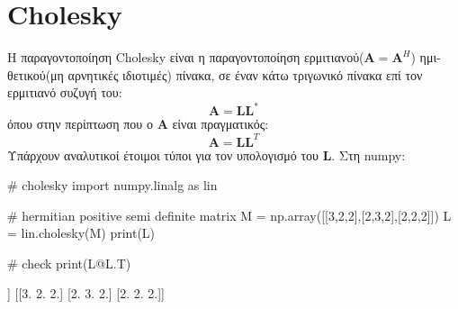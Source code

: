 \section{{\en Cholesky}}
Η παραγοντοποίηση {\en Cholesky} είναι η παραγοντοποίηση  ερμιτιανού($\mathbf{A}=\mathbf{A}^{H}$) ημι-θετικού(μη αρνητικές ιδιοτιμές) πίνακα, σε έναν κάτω τριγωνικό πίνακα επί τον ερμιτιανό συζυγή του:
\begin{equation}
\mathbf{A}=\mathbf{L} \mathbf{L}^{*}
\end{equation}
όπου στην περίπτωση που ο $\mathbf{A}$ είναι πραγματικός:
\begin{equation}
\mathbf{A}=\mathbf{L} \mathbf{L}^T
\end{equation}
Υπάρχουν αναλυτικοί έτοιμοι τύποι για τον υπολογισμό του $
\mathbf{L}$. Στη {\en numpy}:
\en
\begin{python}
# cholesky
import numpy.linalg as lin

# hermitian positive semi definite matrix
M = np.array([[3,2,2],[2,3,2],[2,2,2]])
L = lin.cholesky(M)
print(L)

# check
print(L@L.T)
\end{python}
\vspace*{-0.7cm}
\begin{codeout}
[[1.73205081 0.         0.        ]
 [1.15470054 1.29099445 0.        ]
 [1.15470054 0.51639778 0.63245553]]
[[3. 2. 2.]
 [2. 3. 2.]
 [2. 2. 2.]]
\end{codeout}
\gr